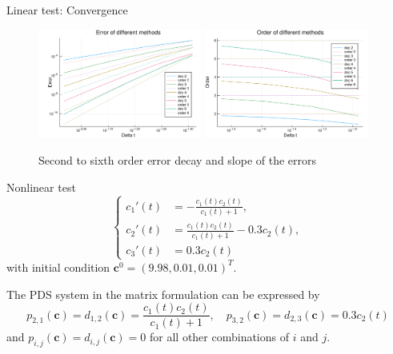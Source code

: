 \documentclass[9pt,compress,t,aspectratio=169]{beamer}
\newcommand{\1}{\begin{pmatrix}
                 1\\
                 1
                \end{pmatrix}}
\def\bc{\mathbf{c}}
\begin{document}
\begin{frame}{Linear test: Convergence}
\begin{figure}[!htp]
\centering
    \includegraphics[width=0.48\textwidth]{images/LinearIntegralErrorOrders26.pdf}
    \includegraphics[width=0.48\textwidth]{images/LinearIntegralSlopesOrders26.pdf}
  \caption{ Second to sixth order error decay and slope of the errors
 }
  \label{fig:Linear_model_error}
\end{figure}

\end{frame}


\begin{frame}{Nonlinear test}
\begin{equation}\label{eq:nonlinear_test}
 \begin{cases}
  c_1'(t)&=-\frac{c_1(t)c_2(t)}{c_1(t)+1},\\
  c_2'(t)&= \frac{c_1(t)c_2(t)}{c_1(t)+1}-0.3c_2(t),\\
  c_3'(t)&=0.3c_2(t)
 \end{cases}
\end{equation}
with initial condition $\bc^0=(9.98,0.01,0.01)^T$. 

The PDS system in the matrix formulation can be expressed by 
\begin{equation*}
 p_{2,1}(\bc)=d_{1,2}(\bc)=\frac{c_1(t)c_2(t)}{c_1(t)+1}, \quad  p_{3,2}(\bc)=d_{2,3}(\bc)=0.3c_2(t)
\end{equation*}
and $p_{i,j}(\bc)=d_{i,j}(\bc)=0$ for all other combinations of $i$ and $j$. 

\end{frame}
\end{document}
